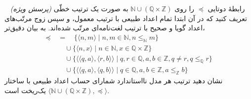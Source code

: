 ~
\emph{(پرسش ویژه)} \;
رابطهٔ دوتایی $\preceq$ را روی $\mathbb{N} \cup (\mathbb{Q} \times \mathbb{Z})$ به صورت یک ترتیب خطّی تعریف کنید که در آن ابتدا تمام اعداد طبیعی با ترتیب معمول، و سپس زوج مرتّب‌های اعداد گویا و صحیح با ترتیب لغت‌نامه‌ای مرتّب شده‌اند. به بیان دقیق‌تر،
\begin{align*}
  \preceq & = \quad \{ \langle n, m \rangle \mid n, m \in \mathbb{N}, n \le_\mathbb{N} m \} \\
  \quad & \quad \cup \{ \langle n, x \rangle \mid n \in \mathbb{N}, x \in \mathbb{Q} \times \mathbb{Z} \} \\
  \quad & \quad \cup \{ \langle \langle q, a \rangle, \langle r, b \rangle \rangle \mid q, r \in \mathbb{Q}, a, b \in \mathbb{Z}, q \neq r, q \le_\mathbb{Q} r \} \\
  \quad & \quad \cup \{ \langle \langle q, a \rangle, \langle q, b \rangle \rangle \mid q \in \mathbb{Q}, a, b \in \mathbb{Z}, a \le_\mathbb{Z} b \}
\end{align*}
نشان دهید ترتیب هر مدل نااستاندارد شمارای حساب اعداد طبیعی با ساختار $\langle \mathbb{N} \cup (\mathbb{Q} \times \mathbb{Z}), \preceq \rangle$ یک‌ریخت است.
